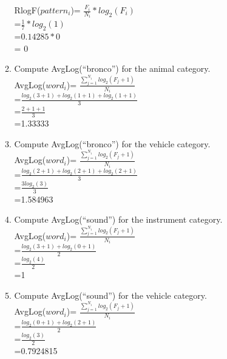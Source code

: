 \documentclass[11pt]{article}
\begin{document}
\begin{enumerate}
\begin{enumerate}
RlogF($pattern_i$)= $\frac{F_i}{N_i} * log_2 (F_i)$\\
			    =$\frac{1}{7} * log_2(1)$\\
			    =$ 0.14285 * 0 $ \\
			    = 0\\	

\item Compute AvgLog(``bronco'') for the {\sc animal} category. \\

AvgLog($word_i$)= $\frac{\sum\limits_{j=1}^{N_i} log_2(F_j +1)}{N_i}$\\
			=$\frac{log_2(3+1) + log_2(1+1) +log_2(1+1)}{3}$\\
			=$\frac{2+1+1}{3}$\\
			=1.33333\\
				
				

\item Compute AvgLog(``bronco'') for the {\sc vehicle} category. \\

AvgLog($word_i$)= $\frac{\sum\limits_{j=1}^{N_i} log_2(F_j +1)}{N_i}$\\
			=$\frac{log_2(2+1) + log_2(2+1) +log_2(2+1)}{3}$\\
			=$\frac{3log_2(3)}{3}$\\
			=1.584963\\
				


\item Compute AvgLog(``sound'') for the {\sc instrument} category. \\

AvgLog($word_i$)= $\frac{\sum\limits_{j=1}^{N_i} log_2(F_j +1)}{N_i}$\\
			=$\frac{log_2(3+1) + log_2(0+1)}{2}$\\
			=$\frac{log_2(4)}{2}$\\
			=1\\


\item Compute AvgLog(``sound'') for the {\sc vehicle} category. \\

AvgLog($word_i$)= $\frac{\sum\limits_{j=1}^{N_i} log_2(F_j +1)}{N_i}$\\
			=$\frac{log_2(0+1) + log_2(2+1)}{2}$\\
			=$\frac{log_2(3)}{2}$\\
			=0.7924815\\



\end{enumerate}
\end{enumerate}
\end{document}
